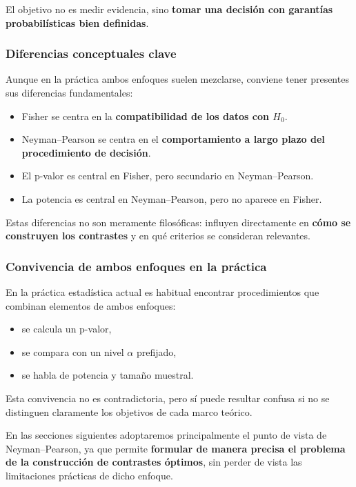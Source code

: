 \documentclass[
]{article}
\providecommand{\tightlist}{%
  \setlength{\itemsep}{0pt}\setlength{\parskip}{0pt}}
\begin{document}
El objetivo no es medir evidencia, sino \textbf{tomar una decisión con garantías probabilísticas bien definidas}.

\subsubsection{Diferencias conceptuales clave}\label{diferencias-conceptuales-clave}

Aunque en la práctica ambos enfoques suelen mezclarse, conviene tener presentes sus diferencias fundamentales:

\begin{itemize}
\tightlist
\item
  Fisher se centra en la \textbf{compatibilidad de los datos con \(H_0\)}.
\item
  Neyman--Pearson se centra en el \textbf{comportamiento a largo plazo del procedimiento de decisión}.
\item
  El p-valor es central en Fisher, pero secundario en Neyman--Pearson.
\item
  La potencia es central en Neyman--Pearson, pero no aparece en Fisher.
\end{itemize}

Estas diferencias no son meramente filosóficas: influyen directamente en \textbf{cómo se construyen los contrastes} y en qué criterios se consideran relevantes.

\subsubsection{Convivencia de ambos enfoques en la práctica}\label{convivencia-de-ambos-enfoques-en-la-pruxe1ctica}

En la práctica estadística actual es habitual encontrar procedimientos que combinan elementos de ambos enfoques:

\begin{itemize}
\tightlist
\item
  se calcula un p-valor,
\item
  se compara con un nivel \(\alpha\) prefijado,
\item
  se habla de potencia y tamaño muestral.
\end{itemize}

Esta convivencia no es contradictoria, pero sí puede resultar confusa si no se distinguen claramente los objetivos de cada marco teórico.

En las secciones siguientes adoptaremos principalmente el punto de vista de Neyman--Pearson, ya que permite \textbf{formular de manera precisa el problema de la construcción de contrastes óptimos}, sin perder de vista las limitaciones prácticas de dicho enfoque.
\end{document}
